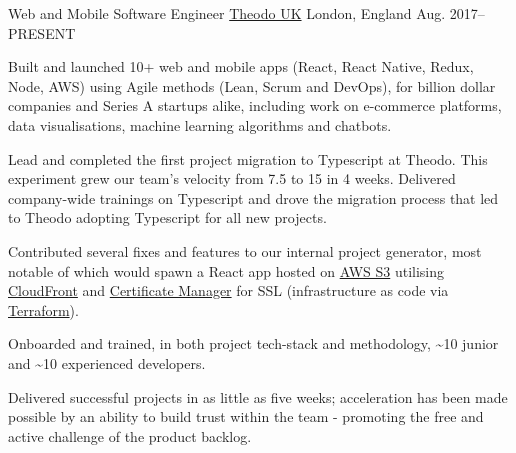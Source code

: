 
\begin{cventries}

  \cventry
    {Web and Mobile Software Engineer}
    {\href{https://www.theodo.co.uk/}{Theodo UK}}
    {London, England}
    {Aug. 2017--\textsc{PRESENT}}
    {
      \begin{cvitems}
        \item Built and launched 10+ web and mobile apps (React, React Native, Redux, Node, AWS) using Agile methods (Lean, Scrum and DevOps), for billion dollar companies and Series A startups alike, including work on e-commerce platforms, data visualisations, machine learning algorithms and chatbots.
        \item Lead and completed the first project migration to Typescript at Theodo. This experiment grew our team's velocity from 7.5 to 15 in 4 weeks. Delivered company-wide trainings on Typescript and drove the migration process that led to Theodo adopting Typescript for all new projects.
        \item Contributed several fixes and features to our internal project generator, most notable of which would spawn a React app hosted on \href{https://aws.amazon.com/s3/}{AWS S3} utilising \href{https://aws.amazon.com/cloudfront/}{CloudFront} and \href{https://aws.amazon.com/certificate-manager/}{Certificate Manager} for SSL (infrastructure as code via \href{https://www.terraform.io/}{Terraform}).
        \item Onboarded and trained, in both project tech-stack and methodology, \textasciitilde{}10 junior and \textasciitilde{}10 experienced developers.
        \item Delivered successful projects in as little as five weeks; acceleration has been made possible by an ability to build trust within the team - promoting the free and active challenge of the product backlog.
      \end{cvitems}
    }

\end{cventries}
